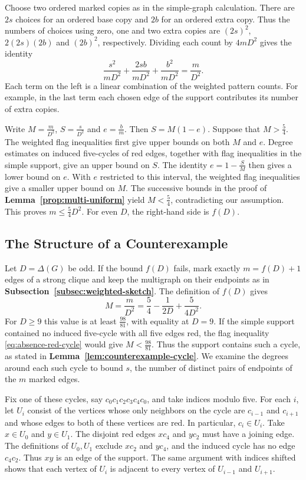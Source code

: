Choose two ordered marked copies as in the simple-graph calculation.
There are $2s$ choices for an ordered base copy and $2b$ for an ordered
extra copy. Thus the numbers of choices using zero, one and two extra
copies are $(2s)^2$, $2(2s)(2b)$ and $(2b)^2$, respectively. Dividing
each count by $4mD^2$ gives the identity
\[
 \frac{s^2}{mD^2}+\frac{2sb}{mD^2}+\frac{b^2}{mD^2}
 =\frac{m}{D^2}.
\]
Each term on the left is a linear combination of the weighted
pattern counts. For example, in the last term each chosen edge of
the support contributes its number of extra copies.

Write $M=\frac{m}{D^2}$, $S=\frac{s}{D^2}$ and $e=\frac{b}{m}$.
Then $S=M(1-e)$. Suppose that $M>\frac{5}{4}$. The weighted flag
inequalities first give upper bounds on both $M$ and $e$. Degree
estimates on induced five-cycles of red edges, together with flag
inequalities in the simple support, give an upper bound on $S$.
The identity $e=1-\frac{S}{M}$ then gives a lower bound on $e$.
With $e$ restricted to this interval, the weighted flag inequalities
give a smaller upper bound on $M$. The successive bounds in the proof
of \textbf{Lemma~\ref{prop:multi-uniform}} yield $M<\frac{5}{4}$,
contradicting our assumption. This proves $m\leq\frac{5}{4}D^2$.
For even $D$, the right-hand side is $f(D)$.

\subsection{The Structure of a Counterexample}\label{subsec:odd-sketch}

Let $D=\Delta(G)$ be odd. If the bound $f(D)$ fails, mark exactly
$m=f(D)+1$ edges of a strong clique and keep the multigraph on their
endpoints as in \textbf{Subsection~\ref{subsec:weighted-sketch}}.
The definition of $f(D)$ gives
\[
 M=\frac{m}{D^2}=\frac{5}{4}-\frac{1}{2D}+\frac{5}{4D^2}.
\]
For $D\geq9$ this value is at least $\frac{98}{81}$, with equality
at $D=9$. If the simple support contained no induced five-cycle with
all five edges red, the flag inequality \eqref{eq:absence-red-cycle} would give
$M<\frac{98}{81}$. Thus the support contains such a cycle, as stated
in \textbf{Lemma~\ref{lem:counterexample-cycle}}. We examine the degrees around
each such cycle to bound $s$, the number of distinct pairs of
endpoints of the $m$ marked edges.

Fix one of these cycles, say $c_0c_1c_2c_3c_4c_0$, and take
indices modulo five. For each $i$, let $U_i$ consist of the vertices
whose only neighbors on the cycle are $c_{i-1}$ and $c_{i+1}$ and
whose edges to both of these vertices are red. In particular,
$c_i\in U_i$. Take $x\in U_0$ and $y\in U_1$. The disjoint red edges
$xc_4$ and $yc_2$ must have a joining edge. The definitions of
$U_0,U_1$ exclude $xc_2$ and $yc_4$, and the induced cycle has no
edge $c_4c_2$. Thus $xy$ is an edge of the support. The same argument
with indices shifted shows that each vertex of $U_i$ is adjacent to
every vertex of $U_{i-1}$ and $U_{i+1}$.


